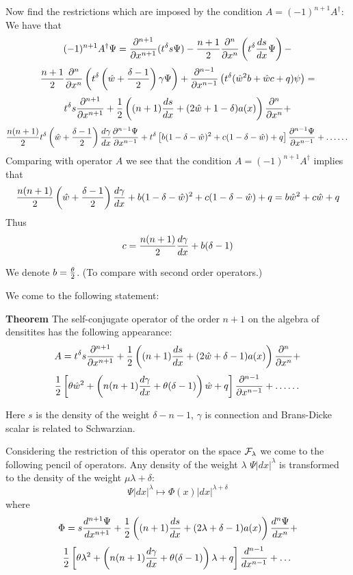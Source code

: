 Now find the restrictions which are imposed by the condition $A=(-1)^{n+1}A^\dagger$:
       We have that
         $$
    (-1)^{n+1}A^\dagger\Psi=
    {\partial^{n+1}\over \partial x^{n+1}}(t^\delta s\Psi)-
    {n+1\over 2}{\partial^{n}\over \partial x^{n}}\left(t^\delta {ds\over dx}\Psi\right)-
             $$
             $$
    {n+1\over 2}{\partial^{n}\over \partial x^{n}}\left(t^\delta \left(\hat w+{\delta-1\over 2}\right)\gamma\Psi\right)+
    {\partial^{n-1}\over \partial x^{n-1}}\left(t^\delta (\hat w^2 b+\hat w c+q)\psi\right)=
         $$
         $$
     t^\delta
    s{\partial^{n+1}\over \partial x^{n+1}}
        +{1\over 2}
        \left(
        (n+1){ds\over dx}+
        (2\hat w+1-\delta)a(x)
               \right) {\partial^{n}\over \partial x^{n}}+
               $$
               $$
        {n(n+1)\over 2}t^\delta \left(\hat w+{\delta-1\over 2}\right){d\gamma\over dx}{\partial ^{n-1}\Psi\over \partial x^{n-1}}+
        t^\delta\left[b(1-\delta-\hat w)^2+c(1-\delta-\hat w)+q\right]{\partial^{n-1}\Psi\over \partial x^{n-1}}+\dots
            \dots
         $$
         Comparing with operator $A$ we see that the condition $A=(-1)^{n+1}A^\dagger$ implies that
                     $$
                     {n(n+1)\over 2}\left(\hat w+{\delta-1\over 2}\right){d\gamma\over dx}+
                     b(1-\delta-\hat w)^2+c(1-\delta-\hat w)+q=
                     b \hat w^2+c\hat w+q
                     $$
Thus
                $$
             c={n(n+1)\over 2}
             {d \gamma\over dx}+b(\delta-1)
                $$

We denote $b={\theta\over 2}$. (To compare with second order operators.)

We come to the following statement:

  {\bf Theorem} The self-conjugate operator of the order $n+1$ on the algebra of densitites has the following appearance:
                    $$
            A=t^\delta
    s{\partial^{n+1}\over \partial x^{n+1}}
        +{1\over 2}
        \left(
        (n+1){ds\over dx}+
        (2\hat w+\delta-1)a(x)
               \right) {\partial^{n}\over \partial x^{n}}+
               $$
               $$
               {1\over 2}\left[
               \theta\hat w^2+\left(n(n+1){d\gamma\over dx}+\theta(\delta-1)\right) \hat w+q
               \right]{\partial^{n-1}\over \partial x^{n-1}}+\dots
            \dots
                                      $$

Here $s$ is the density of the weight $\delta-n-1$, $\gamma$ is connection
and Brans-Dicke scalar is related to Schwarzian.

Considering the restriction of this operator on the space  $\cal F_\lambda$
we come to the following pencil of operators.
Any density of the weight $\lambda$  $\Psi|dx|^\lambda$ is transformed to the density
of the weight $\mu\lambda+\delta$:
              $$
 \Psi|dx|^\lambda\mapsto \Phi(x)|dx|^{\lambda+\delta}
    $$
    where
              $$
              \Phi=
    s{d^{n+1}\Psi\over d x^{n+1}}
        +{1\over 2}
        \left(
        (n+1){ds\over dx}+
        (2\lambda+\delta-1)a(x)
               \right) {d^{n}\Psi\over d x^{n}}+
               $$
               $$
               {1\over 2}\left[
               \theta \lambda^2+\left(n(n+1){d\gamma\over dx}+\theta(\delta-1)\right) \lambda+q
               \right]{d^{n-1}\over d x^{n-1}}+\dots
              $$

